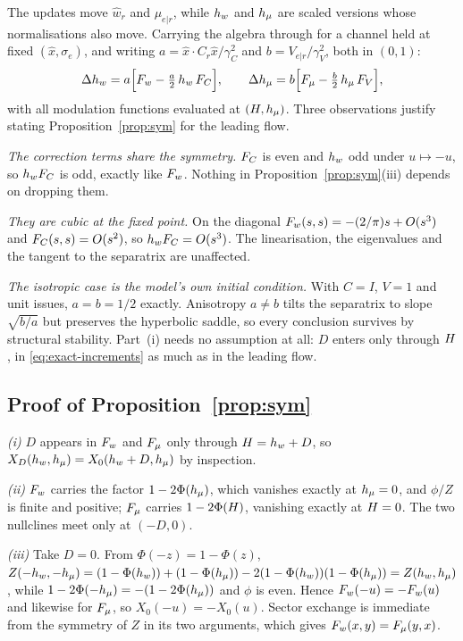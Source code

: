 The updates move $\hat{w}_r$ and $\mu_{e|r}$, while $h_{w}$ and $h_{\mu}$ are scaled
versions whose normalisations also move. Carrying the algebra through for a
channel held at fixed $(\hat{x},\sigma_e)$, and writing
$a=\hat{x}\!\cdot\!C_r\hat{x}/\gamma_C^{2}$ and $b=V_{e|r}/\gamma_V^{2}$, both in
$(0,1)$:
%
\begin{equation}
  \Delta h_{w} = a\Bigl[F_{w} - \tfrac{a}{2}\,h_{w}\,F_{C}\Bigr],
  \qquad
  \Delta h_{\mu} = b\Bigl[F_{\mu} - \tfrac{b}{2}\,h_{\mu}\,F_{V}\Bigr],
  \label{eq:exact-increments}
\end{equation}
%
with all modulation functions evaluated at $(H,h_{\mu})$. Three observations
justify stating Proposition~\ref{prop:sym} for the leading flow.

\emph{The correction terms share the symmetry.} $F_{C}$ is even and $h_{w}$ odd
under $u\mapsto-u$, so $h_{w}F_{C}$ is odd, exactly like $F_{w}$. Nothing in
Proposition~\ref{prop:sym}(iii) depends on dropping them.

\emph{They are cubic at the fixed point.} On the diagonal
$F_{w}(s,s)=-(2/\pi)s+O(s^3)$ and $F_{C}(s,s)=O(s^2)$, so $h_{w}F_{C}=O(s^3)$. The
linearisation, the eigenvalues and the tangent to the separatrix are unaffected.

\emph{The isotropic case is the model's own initial condition.} With $C=I$,
$V=1$ and unit issues, $a=b=1/2$ exactly. Anisotropy $a\neq b$ tilts the
separatrix to slope $\sqrt{b/a}$ but preserves the hyperbolic saddle, so every
conclusion survives by structural stability. Part~(i) needs no assumption at
all: $D$ enters only through $H$, in \eqref{eq:exact-increments} as much as in
the leading flow.

\subsection{Proof of Proposition~\ref{prop:sym}}

\emph{(i)} $D$ appears in $F_{w}$ and $F_{\mu}$ only through $H=h_{w}+D$, so
$X_D(h_{w},h_{\mu})=X_0(h_{w}+D,h_{\mu})$ by inspection.

\emph{(ii)} $F_{w}$ carries the factor $1-2\Phi(h_{\mu})$, which vanishes exactly at
$h_{\mu}=0$, and $\phi/Z$ is finite and positive; $F_{\mu}$ carries $1-2\Phi(H)$,
vanishing exactly at $H=0$. The two nullclines meet only at $(-D,0)$.

\emph{(iii)} Take $D=0$. From $\Phi(-z)=1-\Phi(z)$,
$Z(-h_{w},-h_{\mu})=(1-\Phi(h_{w}))+(1-\Phi(h_{\mu}))-2(1-\Phi(h_{w}))(1-\Phi(h_{\mu}))=Z(h_{w},h_{\mu})$,
while $1-2\Phi(-h_{\mu})=-(1-2\Phi(h_{\mu}))$ and $\phi$ is even. Hence
$F_{w}(-u)=-F_{w}(u)$ and likewise for $F_{\mu}$, so $X_0(-u)=-X_0(u)$. Sector exchange
is immediate from the symmetry of $Z$ in its two arguments, which gives
$F_{w}(x,y)=F_{\mu}(y,x)$.

